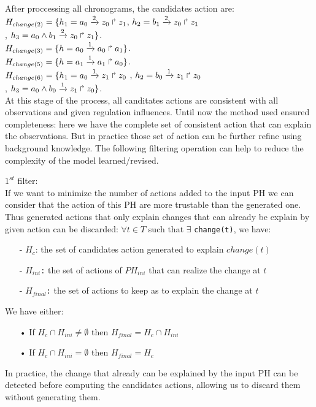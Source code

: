 After proccessing all chronograms, the candidates action are: \\
$H_{change(2)} = \{ h_1=a_0\xrightarrow{2} z_0 \Rsh z_1$, $  h_2=b_1\xrightarrow{2} z_0 \Rsh z_1$ \\
, \hspace{0.75cm}$  h_3=a_0 \wedge b_1 \xrightarrow{2} z_0 \Rsh z_1 \}$.\\
$H_{change(3)} = \{ h=a_0\xrightarrow{1} a_0 \Rsh a_1  \}$. \\

$H_{change(5)} = \{ h=a_1\xrightarrow{1} a_1 \Rsh a_0  \}$. \\

$H_{change(6)} = \{ h_1=a_0\xrightarrow{1} z_1 \Rsh z_0$ , $  h_2=b_0\xrightarrow{1} z_1 \Rsh z_0$ \\
, \hspace{0.75cm} $  h_3=a_0 \wedge b_0 \xrightarrow{1} z_1 \Rsh z_0 \}$. \\

At this stage of the process, all canditates actions are consistent with all observations and given regulation influences.
Until now the method used ensured completeness: here we have the complete set of consistent action that can explain the observations.
But in practice those set of action can be further refine using background knowledge.
The following filtering operation can help to reduce the complexity of the model learned/revised.

$1^{st}$ filter: \\

If we want to minimize the number of actions added to the input PH we can consider that the action of this PH are more trustable than the generated one. Thus generated actions that only explain changes that can already be explain by given action can be discarded: $\forall t \in T$ such that $\exists$  \texttt{change(t)}, we have:
\begin{itemize}
\item[-] \texttt{$H_c$}: the set of candidates action generated to explain $change(t)$
\item[-] \texttt{$H_{ini}$:} the set of actions of $PH_{ini}$ that can realize the change at $t$
\item[-] \texttt{$H_{final}$:} the set of actions to keep as to explain the change at $t$
\end{itemize}
We have either:
\begin{itemize}
\item[•] If $H_c \cap H_{ini} \neq \emptyset $ then $H_{final}= H_c \cap H_{ini}$ 
\item[•] If $H_c \cap H_{ini} = \emptyset $ then $H_{final}=H_c$
\end{itemize}
In practice, the change that already can be explained by the input PH can be detected before computing the candidates actions, allowing us to discard them without generating them.

